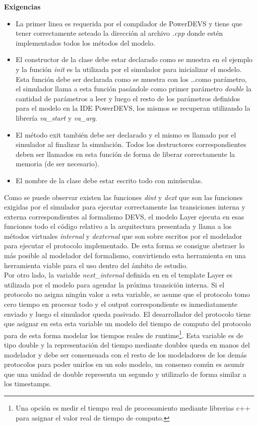 \documentclass[10pt,a4paper]{article}
\begin{document}
\textbf{Exigencias}
\begin{itemize}
\item La primer linea es requerida por el compilador de PowerDEVS y tiene que tener correctamente seteado la dirección al archivo \textit{.cpp} donde estén implementados todos los métodos del modelo.
\item El constructor de la clase debe estar declarado como se muestra en el ejemplo y la función \textit{init} es la utilizada por el simulador para inicializar el modelo. Esta función debe ser declarada como se muestra con los \ldots como parámetro, el simulador llama a esta función pasándole como primer parámetro \textit{double} la cantidad de parámetros a leer y luego el resto de los parámetros definidos para el modelo en la IDE PowerDEVS, los mismos se recuperan utilizando la librería \textit{va\_start} y \textit{va\_arg}.
\item El método exit también debe ser declarado y el mismo es llamado por el simulador al finalizar la simulación. Todos los destructores correspondientes deben ser llamados en esta función de forma de liberar correctamente la memoria (de ser necesario).
\item El nombre de la clase debe estar escrito todo con minúsculas.
\end{itemize}

Como se puede observar existen las funciones \textit{dint} y \textit{dext} que son las funciones exigidas por el simulador para ejecutar correctamente las transiciones interna y externa correspondientes al formalismo DEVS, el modelo Layer ejecuta en esas funciones todo el código relativo a la arquitectura presentada y llama a los métodos virtuales \textit{internal} y \textit{dexternal} que son sobre escritos por el modelador para ejecutar el protocolo implementado. De esta forma se consigue abstraer lo más posible al modelador del formalismo, convirtiendo esta herramienta en una herramienta viable para el uso dentro del ámbito de estudio. \\

Por otro lado, la variable \textit{next\_internal} definida en en el template Layer es utilizada por el modelo para agendar la próxima transición interna. Si el protocolo no asigna ningún valor a esta variable, se asume que el protocolo tomo cero tiempo en procesar todo y el output correspondiente es inmediatamente enviado y luego el simulador queda pasivado. El desarrollador del protocolo tiene que asignar en esta esta variable un modelo del tiempo de computo del protocolo para de esta forma modelar los tiempos reales de runtime\footnote{Una opción es medir el tiempo real de procesamiento mediante librerias c++ para asignar el valor real de tiempo de computo.}. Esta variable es de tipo double y la representación del tiempo mediante doubles queda en manos del modelador y debe ser consensuada con el resto de los modeladores de los demás protocolos para poder unirlos en un solo modelo, un consenso común es asumir que una unidad de double representa un segundo y utilizarlo de forma similar a los timestamps. \\
\end{document}
